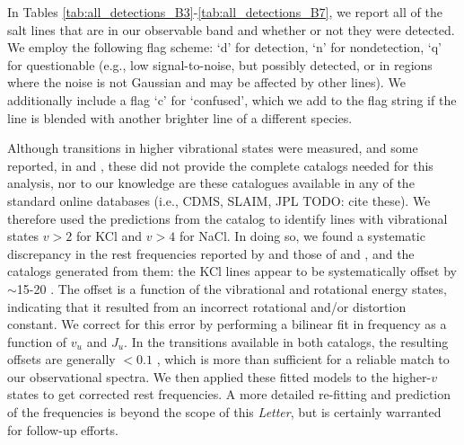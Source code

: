 \documentclass[twocolumn]{aastex62}
\begin{document}
In Tables \ref{tab:all_detections_B3}-\ref{tab:all_detections_B7}, we report
all of the salt lines that are in our observable band and whether or not they were
detected.  We employ the following
flag scheme:
`d' for detection, `n' for nondetection, `q' for questionable (e.g., low
signal-to-noise, but possibly detected, or in regions where the noise is
not Gaussian and may be affected by other lines).
We additionally include a flag `c' for `confused', which we add to the flag
string if the line is blended with another brighter line of a different species.

Although transitions in higher vibrational states were measured, and some reported, in \citet{Caris2004a} and \citet{Caris2002a}, these did not provide the complete catalogs needed for this analysis, nor to our knowledge are these catalogues available in any of the standard online databases (i.e., CDMS, SLAIM, JPL {\color{red}TODO: cite
these}). We therefore used the predictions from the \citet{Barton2014a} catalog to identify lines with vibrational states $v>2$ for KCl and $v>4$ for NaCl.  In doing so, we found a systematic discrepancy in the rest frequencies
reported by \citet{Barton2014a} and those of \citet{Caris2004a} and \citet{Caris2002a}, and the  catalogs generated from them: the KCl lines appear to be systematically offset by $\sim$15-20 \kms.  The offset is a function of the vibrational
and rotational energy states, indicating that it resulted from an incorrect rotational
and/or distortion constant.  We correct for this error by performing a bilinear fit
in frequency as a function of $v_u$ and $J_u$.  In the transitions available
in both catalogs, the resulting offsets are generally $<0.1$ \kms, which is more than 
sufficient for a reliable match to our observational spectra.  We then applied these fitted models to the higher-$v$ states to get corrected rest frequencies.  A more detailed re-fitting and prediction of the frequencies is beyond the scope of this \emph{Letter}, but is certainly warranted for follow-up efforts.





\end{document}

